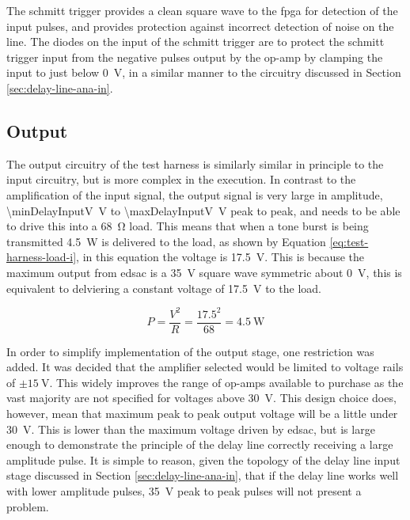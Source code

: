 The schmitt trigger provides a clean square wave to the \gls{fpga} for detection of the input pulses, and provides protection against incorrect detection of noise on the line. The diodes on the input of the schmitt trigger are to protect the schmitt trigger input from the negative pulses output by the op-amp by clamping the input to just below \SI{0}{\volt}, in a similar manner to the circuitry discussed in Section \ref{sec:delay-line-ana-in}.

\subsection{Output}

The output circuitry of the test harness is similarly similar in principle to the input circuitry, but is more complex in the execution. In contrast to the amplification of the input signal, the output signal is very large in amplitude, \SI{\minDelayInputV}{\volt} to \SI{\maxDelayInputV}{\volt} peak to peak, and needs to be able to drive this into a \SI{68}{\ohm} load. This means that when a tone burst is being transmitted \SI{4.5}{\watt} is delivered to the load, as shown by Equation \ref{eq:test-harness-load-i}, in this equation the voltage is \SI{17.5}{\volt}. This is because the maximum output from \gls{edsac} is a \SI{35}{\volt} square wave symmetric about \SI{0}{\volt}, this is equivalent to delviering a constant voltage of \SI{17.5}{\volt} to the load.

\begin{equation}
P = \frac{V^2}{R} = \frac{17.5^2}{68} = \SI{4.5}{\watt} \label{eq:test-harness-load-i}
\end{equation}

In order to simplify implementation of the output stage, one restriction was added. It was decided that the amplifier selected would be limited to voltage rails of $\pm \SI{15}{\volt}$. This widely improves the range of op-amps available to purchase as the vast majority are not specified for voltages above \SI{30}{\volt}. This design choice does, however, mean that maximum peak to peak output voltage will be a little under \SI{30}{\volt}. This is lower than the maximum voltage driven by \gls{edsac}, but is large enough to demonstrate the principle of the delay line correctly receiving a large amplitude pulse. It is simple to reason, given the topology of the delay line input stage discussed in Section \ref{sec:delay-line-ana-in}, that if the delay line works well with lower amplitude pulses, \SI{35}{\volt} peak to peak pulses will not present a problem.

